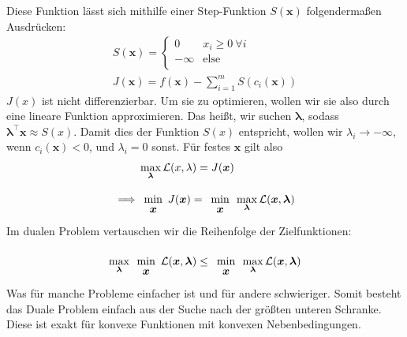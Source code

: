 \documentclass{report}
\renewcommand{\min}[1] {
    \begin{array}{c}
        \vphantom{#1}\\[-3pt] %
        \text{min}\\[-3pt]
        #1\\
        \end{array}
    }
\begin{document}
Diese Funktion lässt sich mithilfe einer Step-Funktion $S(\bm{x})$ folgendermaßen Ausdrücken:
\begin{align*}
 S(\bm{x}) = \begin{cases}
              0 & x_i \geq 0\ \forall i\\
              -\infty & \text{else}\\
             \end{cases}\\
J(\bm{x}) = f(\bm{x}) - \sum_{i=1}^{m}S(c_i(\bm{x}))
\end{align*}
$J(x)$ ist nicht differenzierbar. Um sie zu optimieren, wollen wir sie also durch eine lineare Funktion approximieren. Das heißt, wir   suchen $\bm{\lambda}$, sodass $\bm{\lambda}^\top \bm{x} \approx S(x)$. Damit dies der Funktion $S(x)$ entspricht, wollen wir $\lambda_i \to -\infty$, wenn $c_i(\bm{x}) < 0$, und $\lambda_i = 0$ sonst. Für festes $\bm{x}$ gilt also
\begin{align*}
 &\max_{\bm{\lambda}} \mathcal{L}(x, \lambda) = J(\bm{x})\\
 \implies &\min{\bm{x}} J(\bm{x}) = \min{\bm{x}}\max_{\bm{\lambda}} \mathcal{L}(\bm{x}, \bm{\lambda})
\end{align*}
Im dualen Problem vertauschen wir die Reihenfolge der Zielfunktionen:
\begin{align*}
 \max_{\bm{\lambda}} \min{\bm{x}} \mathcal{L}(\bm{x}, \bm{\lambda}) \leq \min{\bm{x}}  \max_{\bm{\lambda}} \mathcal{L}(\bm{x}, \bm{\lambda})
\end{align*}
Was für manche Probleme einfacher ist und für andere schwieriger. Somit besteht das Duale Problem einfach aus der Suche nach der größten unteren Schranke. Diese ist exakt für konvexe Funktionen mit konvexen Nebenbedingungen.
\fi
%
%
%
\end{document}
